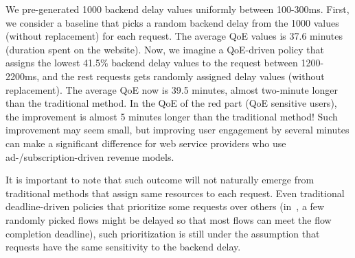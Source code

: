 We pre-generated 1000 backend delay values uniformly between 100-300ms. 
First, we consider a baseline that picks a random backend delay from the 1000 values (without replacement) for each request. The average QoE values is 37.6 minutes (duration spent on the website).
Now, we imagine a QoE-driven policy that assigns the lowest 41.5\% backend delay values to the request between 1200-2200ms, and the rest requests gets randomly assigned delay values (without replacement). 
The average QoE now is 39.5 minutes, almost two-minute longer than the traditional method. In the QoE of the red part (QoE sensitive users), the improvement is almost 5 minutes longer than the traditional method!
Such improvement may seem small, but improving user engagement by several minutes can make a significant difference for web service providers who use ad-/subscription-driven revenue models.

It is important to note that such outcome will not naturally emerge from traditional methods that assign same resources to each request.
Even traditional deadline-driven policies that prioritize some requests over others (\eg in~\cite{wilson2011better}, a few randomly picked flows might be delayed so that most flows can meet the flow completion deadline), such prioritization is still under the assumption that requests have the same sensitivity to the backend delay.



